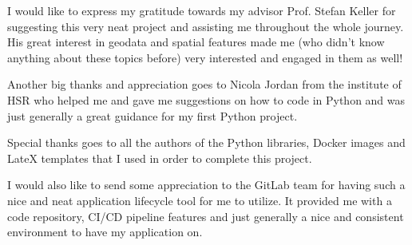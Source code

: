I would like to express my gratitude towards my advisor Prof. Stefan Keller for suggesting this very neat project and assisting me throughout the whole journey. His great interest in geodata and spatial features made me (who didn't know anything about these topics before) very interested and engaged in them as well!

Another big thanks and appreciation goes to Nicola Jordan from the institute of HSR who helped me and gave me suggestions on how to code in Python and was just generally a great guidance for my first Python project.


Special thanks goes to all the authors of the Python libraries, Docker images and LateX templates that I used in order to complete this project.

I would also like to send some appreciation to the GitLab team for having such a nice and neat application lifecycle tool for me to utilize. It provided me with a code repository, CI/CD pipeline features and just generally a nice and consistent environment to have my application on.